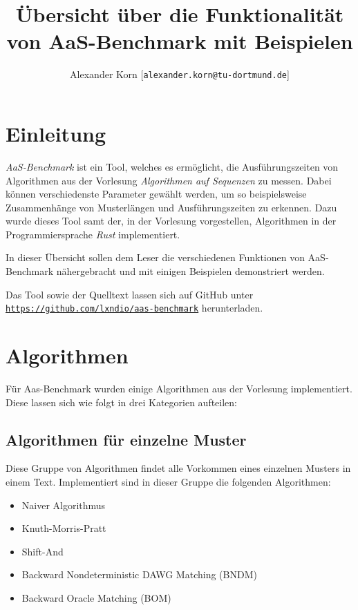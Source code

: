 \documentclass[twocolumn]{article}
\title{\Large \textbf{Übersicht über die Funktionalität von AaS-Benchmark mit Beispielen}}
\author{Alexander Korn [\texttt{alexander.korn@tu-dortmund.de}]}
\date{}
\begin{document}
\maketitle

\section{Einleitung}

\textit{AaS-Benchmark} ist ein Tool, welches es ermöglicht, die Ausführungszeiten von Algorithmen aus der Vorlesung \textit{Algorithmen auf Sequenzen} zu messen. Dabei können verschiedenste Parameter gewählt werden, um so beispielsweise Zusammenhänge von Musterlängen und Ausführungszeiten zu erkennen. Dazu wurde dieses Tool samt der, in der Vorlesung vorgestellen, Algorithmen in der Programmiersprache \textit{Rust} implementiert.

In dieser Übersicht sollen dem Leser die verschiedenen Funktionen von AaS-Benchmark nähergebracht und mit einigen Beispielen demonstriert werden.

Das Tool sowie der Quelltext lassen sich auf GitHub unter \hyperlink{https://github.com/lxndio/aas-benchmark}{\texttt{https://github.com/lxndio/aas-benchmark}} herunterladen.

\section{Algorithmen}

Für Aas-Benchmark wurden einige Algorithmen aus der Vorlesung implementiert. Diese lassen sich wie folgt in drei Kategorien aufteilen:

\subsection{Algorithmen für einzelne Muster}

Diese Gruppe von Algorithmen findet alle Vorkommen eines einzelnen Musters in einem Text. Implementiert sind in dieser Gruppe die folgenden Algorithmen:

\begin{itemize}
    \setlength\itemsep{0em}
    \item Naiver Algorithmus
    \item Knuth-Morris-Pratt
    \item Shift-And
    \item Backward Nondeterministic DAWG Matching (BNDM)
    \item Backward Oracle Matching (BOM)
\end{itemize}
\end{document}
